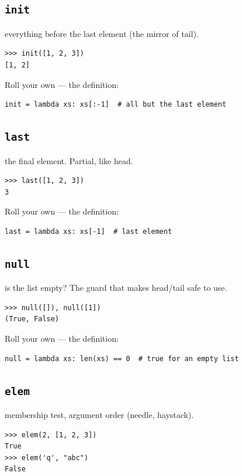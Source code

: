 \documentclass[10pt,letterpaper]{book}
\begin{document}
\subsection{\texttt{init}}\label{def:init}
everything before the last element (the mirror of tail).
\begin{lstlisting}[style=ex]
>>> init([1, 2, 3])
[1, 2]
\end{lstlisting}

Roll your own --- the definition:

\begin{lstlisting}[style=ex]
init = lambda xs: xs[:-1]  # all but the last element
\end{lstlisting}

\subsection{\texttt{last}}\label{def:last}
the final element. Partial, like head.
\begin{lstlisting}[style=ex]
>>> last([1, 2, 3])
3
\end{lstlisting}

Roll your own --- the definition:

\begin{lstlisting}[style=ex]
last = lambda xs: xs[-1]  # last element
\end{lstlisting}
\subsection{\texttt{null}}\label{def:null}
is the list empty? The guard that makes head/tail safe to use.
\begin{lstlisting}[style=ex]
>>> null([]), null([1])
(True, False)
\end{lstlisting}

Roll your own --- the definition:

\begin{lstlisting}[style=ex]
null = lambda xs: len(xs) == 0  # true for an empty list
\end{lstlisting}
\subsection{\texttt{elem}}\label{def:elem}
membership test, argument order (needle, haystack).
\begin{lstlisting}[style=ex]
>>> elem(2, [1, 2, 3])
True
>>> elem('q', "abc")
False
\end{lstlisting}
\end{document}
